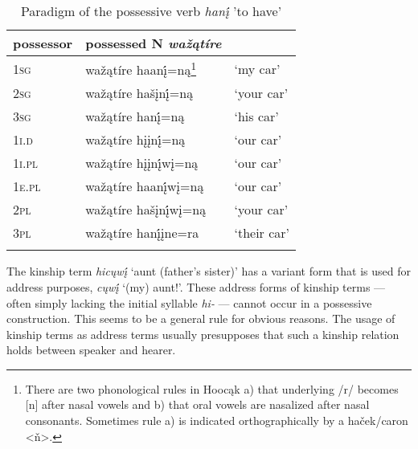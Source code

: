 \documentclass[output=paper]{LSP/langsci}
\begin{document}
\begin{table} 
\caption{Paradigm of the possessive verb \textit{hanį́} 'to have'} \label{haveparadigm}
\begin{tabularx}{.67\textwidth}{ lXl }
\lsptoprule
possessor	& possessed N \textit{waž\k{a}tíre} \\
\midrule
\textsc{1sg}	 & waž\k{a}tíre haanį́=n\k{a}\footnote{There are two phonological rules in Hooc\k{a}k a) that underlying /r/ becomes [n] after nasal vowels and b) that oral vowels are nasalized after nasal consonants. Sometimes rule a) is indicated orthographically by a ha\v{c}ek/caron <\v{n}>.} & `my car' \\
 
\textsc{2sg}	 & waž\k{a}tíre hašįnį́=n\k{a} & `your car' \\
 
\textsc{3sg}	 & waž\k{a}tíre hanį́=n\k{a} & `his car' \\
 
\textsc{1i.d}	& waž\k{a}tíre hįįnį́=n\k{a} & `our car' \\
 
\textsc{1i.pl} & waž\k{a}tíre hįįnį́wį=n\k{a} & `our car' \\
 
\textsc{1e.pl} & waž\k{a}tíre haanį́wį=n\k{a} & `our car' \\
 
\textsc{2pl}	& waž\k{a}tíre hašįnį́wį=n\k{a} & `your car' \\
 
\textsc{3pl}	& waž\k{a}tíre hanį́įne=ra & `their car' \\
\lspbottomrule
\end{tabularx}
\end{table}

The kinship term \textit{hicųwį́} `aunt (father's sister)' has a variant form that is used for address purposes, \textit{cųwį́} `(my) aunt!'. These address forms of kinship terms --- often simply lacking the initial syllable \textit{hi-} --- cannot occur in a possessive construction. This seems to be a general rule for obvious reasons. The usage of kinship terms as address terms usually presupposes that such a kinship relation holds between speaker and hearer. 
\end{document}
